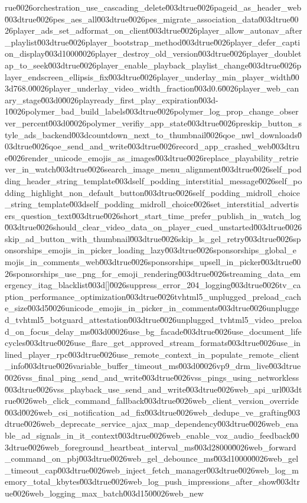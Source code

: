 {rue\u0026orchestration_use_cascading_delete\u003dtrue\u0026pageid_as_header_web\u003dtrue\u0026pes_aes_all\u003dtrue\u0026pes_migrate_association_data\u003dtrue\u0026player_ads_set_adformat_on_client\u003dtrue\u0026player_allow_autonav_after_playlist\u003dtrue\u0026player_bootstrap_method\u003dtrue\u0026player_defer_caption_display\u003d1000\u0026player_destroy_old_version\u003dtrue\u0026player_doubletap_to_seek\u003dtrue\u0026player_enable_playback_playlist_change\u003dtrue\u0026player_endscreen_ellipsis_fix\u003dtrue\u0026player_underlay_min_player_width\u003d768.0\u0026player_underlay_video_width_fraction\u003d0.6\u0026player_web_canary_stage\u003d0\u0026playready_first_play_expiration\u003d-1\u0026polymer_bad_build_labels\u003dtrue\u0026polymer_log_prop_change_observer_percent\u003d0\u0026polymer_verifiy_app_state\u003dtrue\u0026preskip_button_style_ads_backend\u003dcountdown_next_to_thumbnail\u0026qoe_nwl_downloads\u003dtrue\u0026qoe_send_and_write\u003dtrue\u0026record_app_crashed_web\u003dtrue\u0026render_unicode_emojis_as_images\u003dtrue\u0026replace_playability_retriever_in_watch\u003dtrue\u0026search_image_menu_alignment\u003dtrue\u0026self_podding_header_string_template\u003dself_podding_interstitial_message\u0026self_podding_highlight_non_default_button\u003dtrue\u0026self_podding_midroll_choice_string_template\u003dself_podding_midroll_choice\u0026set_interstitial_advertisers_question_text\u003dtrue\u0026short_start_time_prefer_publish_in_watch_log\u003dtrue\u0026should_clear_video_data_on_player_cued_unstarted\u003dtrue\u0026skip_ad_button_with_thumbnail\u003dtrue\u0026skip_ls_gel_retry\u003dtrue\u0026sponsorships_emojis_in_picker_loading_lazy\u003dtrue\u0026sponsorships_global_emojis_in_comments_web\u003dtrue\u0026sponsorships_upsell_in_picker\u003dtrue\u0026sponsorships_use_png_for_emoji_rendering\u003dtrue\u0026streaming_data_emergency_itag_blacklist\u003d[]\u0026suppress_error_204_logging\u003dtrue\u0026tv_caption_performance_optimization\u003dtrue\u0026tvhtml5_unplugged_preload_cache_size\u003d5\u0026unicode_emojis_in_picker_in_comments\u003dtrue\u0026unplugged_tvhtml5_botguard_attestation\u003dtrue\u0026unplugged_tvhtml5_video_preload_on_focus_delay_ms\u003d0\u0026use_bg_facade\u003dtrue\u0026use_document_lifecycles\u003dtrue\u0026use_flare_get_approved_stream_formats\u003dtrue\u0026use_inlined_player_rpc\u003dtrue\u0026use_remote_context_in_populate_remote_client_info\u003dtrue\u0026variable_buffer_timeout_ms\u003d0\u0026vp9_drm_live\u003dtrue\u0026vss_final_ping_send_and_write\u003dtrue\u0026vss_pings_using_networkless\u003dtrue\u0026vss_playback_use_send_and_write\u003dtrue\u0026web_api_url\u003dtrue\u0026web_click_command_fallback\u003dtrue\u0026web_client_version_override\u003d\u0026web_csi_notification_ad_fix\u003dtrue\u0026web_dedupe_ve_grafting\u003dtrue\u0026web_deprecate_service_ajax_map_dependency\u003dtrue\u0026web_enable_ad_signals_in_it_context\u003dtrue\u0026web_enable_voz_audio_feedback\u003dtrue\u0026web_foreground_heartbeat_interval_ms\u003d28000\u0026web_forward_command_on_pbj\u003dtrue\u0026web_gel_debounce_ms\u003d10000\u0026web_gel_timeout_cap\u003dtrue\u0026web_inject_fetch_manager\u003dtrue\u0026web_log_memory_total_kbytes\u003dtrue\u0026web_log_push_impressions_after_show\u003dtrue\u0026web_logging_max_batch\u003d150\u0026web_new}
